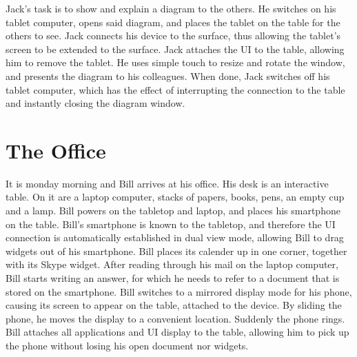 \documentclass[11pt]{amsart}
\begin{document}
Jack's task is to show and explain a diagram to the others.
He switches on his tablet computer, opens said diagram, and places the tablet on the table for the others to see.
Jack connects his device to the surface, thus allowing the tablet's screen to be extended to the surface.
Jack attaches the UI to the table, allowing him to remove the tablet.
He uses simple touch to resize and rotate the window, and presents the diagram to his colleagues.
When done, Jack switches off his tablet computer, which has the effect of interrupting the connection to the table and instantly closing the diagram window.


\section{The Office}

It is monday morning and Bill arrives at his office.
His desk is an interactive table.
On it are a laptop computer, stacks of papers, books, pens, an empty cup and a lamp.
Bill powers on the tabletop and laptop, and places his smartphone on the table.
Bill's smartphone is known to the tabletop, and therefore the UI connection is automatically established in dual view mode, allowing Bill to drag widgets out of his smartphone.
Bill places its calender up in one corner, together with its Skype widget.
After reading through his mail on the laptop computer, Bill starts writing an answer, for which he needs to refer to a document that is stored on the smartphone.
Bill switches to a mirrored display mode for his phone, causing its screen to appear on the table, attached to the device.
By sliding the phone, he moves the display to a convenient location.
Suddenly the phone rings.
Bill attaches all applications and UI display to the table, allowing him to pick up the phone without losing his open document nor widgets.
\end{document}
